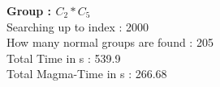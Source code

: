 \textbf{Group : $C_2*C_5$}\\
Searching up to index : 2000\\
How many normal groups are found : 205\\
Total Time in s : 539.9\\
Total Magma-Time in s : 266.68\\
